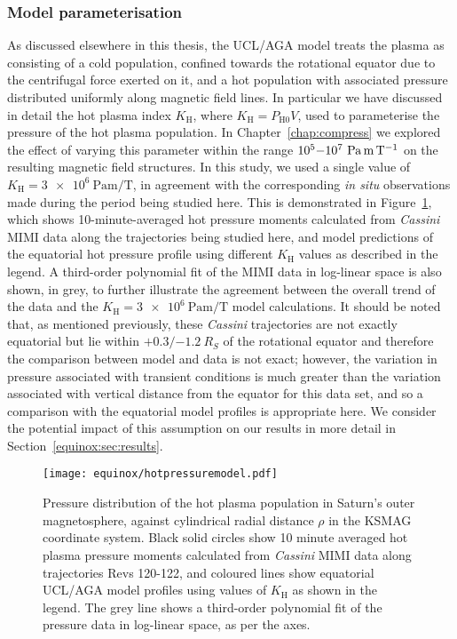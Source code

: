 \subsubsection{Model parameterisation}\label{equinox:sec:modelparamzation}
As discussed elsewhere in this thesis, the UCL/AGA model treats the plasma as consisting of a cold population, confined towards the rotational equator due to the centrifugal force exerted on it, and a hot population with associated pressure distributed uniformly along magnetic field lines. In particular we have discussed in detail the hot plasma index $ K_\mathrm{H}$, where $ K_\mathrm{H}= P_\mathrm{H0}V$, used to parameterise the pressure of the hot plasma population. In Chapter~\ref{chap:compress} we explored the effect of varying this parameter within the range $10^5{\--}10^7~\si{\pascal\meter\per\tesla}$ on the resulting magnetic field structures. In this study, we used a single value of $K_\mathrm{H} = \SI{3e6}{\pascal\m\per\tesla}$, in agreement with the corresponding \textit{in situ} observations made during the period being studied here. This is demonstrated in Figure~\ref{equinox:fig:hotpressuremodel}, which shows 10-minute-averaged hot pressure moments calculated from \textit{Cassini} MIMI data along the trajectories being studied here, and model predictions of the equatorial hot pressure profile using different $K_\mathrm{H}$ values as described in the legend. A third-order polynomial fit of the MIMI data in log-linear space is also shown, in grey, to further illustrate the agreement between the overall trend of the data and the $K_\mathrm{H} = \SI{3e6}{\pascal\m\per\tesla}$ model calculations. It should be noted that, as mentioned previously, these \textit{Cassini} trajectories are not exactly equatorial but lie within $+0.3/\SI{-1.2}{R_S}$ of the rotational equator and therefore the comparison between model and data is not exact; however, the variation in pressure associated with transient conditions is much greater than the variation associated with vertical distance from the equator for this data set, and so a comparison with the equatorial model profiles is appropriate here. We consider the potential impact of this assumption on our results in more detail in Section~\ref{equinox:sec:results}.
\begin{figure}
\centering
\texttt{[image: equinox/hotpressuremodel.pdf]}
\caption[Equatorial hot plasma pressure from \textit{Cassini} MIMI, and model predictions for different $K_\mathrm{H}$ values.]{Pressure distribution of the hot plasma population in Saturn's outer magnetosphere, against cylindrical radial distance $\rho$ in the KSMAG coordinate system. Black solid circles show 10 minute averaged hot plasma pressure moments calculated from \textit{Cassini} MIMI data along trajectories Revs 120-122, and coloured lines show equatorial UCL/AGA model profiles using values of $K_\mathrm{H}$ as shown in the legend. The grey line shows a third-order polynomial fit of the pressure data in log-linear space, as per the axes.}
\label{equinox:fig:hotpressuremodel}
\end{figure}

